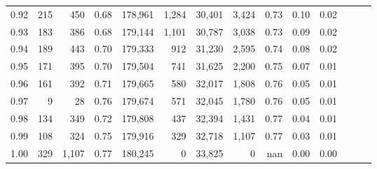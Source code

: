 \begin{tabular}{rrrrrrrrrrrrrr}
0.92 &    215 &    450 &  0.68 &  178,961 &    1,284 &  30,401 &   3,424 &  0.73 &  0.10 &      0.02 \\
0.93 &    183 &    386 &  0.68 &  179,144 &    1,101 &  30,787 &   3,038 &  0.73 &  0.09 &      0.02 \\
0.94 &    189 &    443 &  0.70 &  179,333 &      912 &  31,230 &   2,595 &  0.74 &  0.08 &      0.02 \\
0.95 &    171 &    395 &  0.70 &  179,504 &      741 &  31,625 &   2,200 &  0.75 &  0.07 &      0.01 \\
0.96 &    161 &    392 &  0.71 &  179,665 &      580 &  32,017 &   1,808 &  0.76 &  0.05 &      0.01 \\
0.97 &      9 &     28 &  0.76 &  179,674 &      571 &  32,045 &   1,780 &  0.76 &  0.05 &      0.01 \\
0.98 &    134 &    349 &  0.72 &  179,808 &      437 &  32,394 &   1,431 &  0.77 &  0.04 &      0.01 \\
0.99 &    108 &    324 &  0.75 &  179,916 &      329 &  32,718 &   1,107 &  0.77 &  0.03 &      0.01 \\
1.00 &    329 &  1,107 &  0.77 &  180,245 &        0 &  33,825 &       0 &   nan &  0.00 &      0.00 \\
\bottomrule
\end{tabular}
